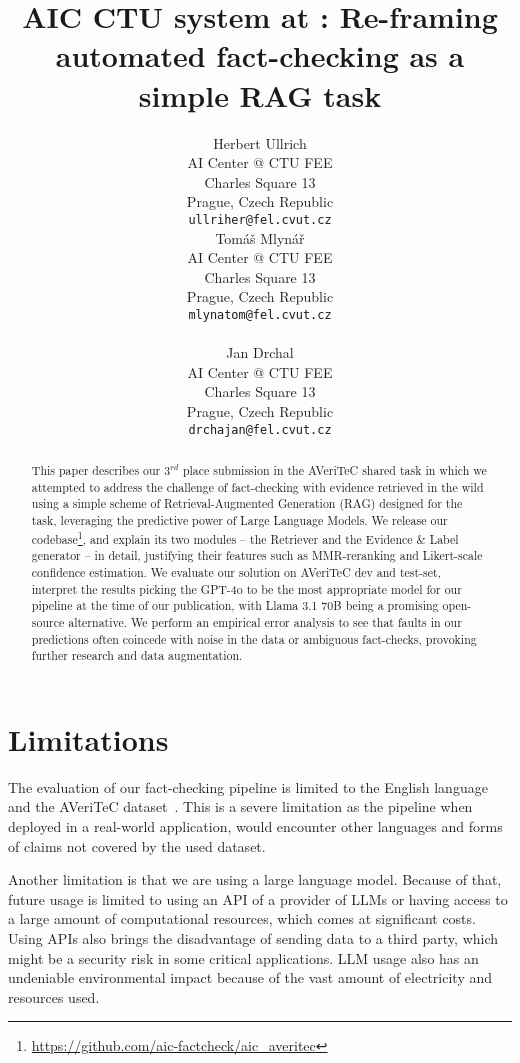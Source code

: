 \documentclass[11pt]{article}
\title{AIC CTU system at \averitec{}: Re-framing automated fact-checking as a simple RAG task}
\author{Herbert Ullrich \\
AI Center @ CTU FEE\\
Charles Square 13\\
Prague, Czech Republic\\
\texttt{ullriher@fel.cvut.cz} \\\And
Tomáš Mlynář \\
AI Center @ CTU FEE\\
Charles Square 13\\
Prague, Czech Republic\\
\texttt{mlynatom@fel.cvut.cz} \\ \\\And
Jan Drchal \\
AI Center @ CTU FEE\\
Charles Square 13\\
Prague, Czech Republic\\
\texttt{drchajan@fel.cvut.cz} \\}
\newcommand{\averitec}{AVeriTeC}
\begin{document}
{\makeatletter\acl@finalcopytrue
  \maketitle
}
\begin{abstract}
This paper describes our $3^{rd}$ place submission in the \averitec{} shared task in which we attempted to address the challenge of fact-checking with evidence retrieved in the wild using a simple scheme of Retrieval-Augmented Generation (RAG) designed for the task, leveraging the predictive power of Large Language Models.
We release our codebase\footnote{\url{https://github.com/aic-factcheck/aic_averitec}}, and explain its two modules -- the Retriever and the Evidence \& Label generator -- in detail, justifying their features such as MMR-reranking and Likert-scale confidence estimation.
We evaluate our solution on \averitec{} dev and test-set, interpret the results picking the GPT-4o to be the most appropriate model for our pipeline at the time of our publication, with Llama 3.1 70B being a promising open-source alternative.
We perform an empirical error analysis to see that faults in our predictions often coincede with noise in the data or ambiguous fact-checks, provoking further research and data augmentation.

\end{abstract}





%


\section*{Limitations}
The evaluation of our fact-checking pipeline is limited to the English language and the \averitec{} dataset~\cite{averitec2024}. This is a severe limitation as the pipeline when deployed in a real-world application, would encounter other languages and forms of claims not covered by the used dataset.

Another limitation is that we are using a large language model. Because of that, future usage is limited to using an API of a provider of LLMs or having access to a large amount of computational resources, which comes at significant costs. Using APIs also brings the disadvantage of sending data to a third party, which might be a security risk in some critical applications. LLM usage also has an undeniable environmental impact because of the vast amount of electricity and resources used.
\end{document}
